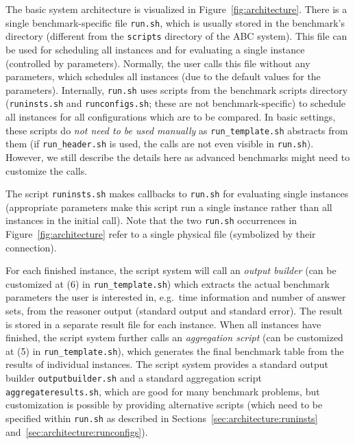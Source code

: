 \documentclass[a4paper]{article}
\newcommand{\abcs}{{ABC}}
\begin{document}
		The basic system architecture is visualized in Figure~\ref{fig:architecture}.
		There is a single benchmark-specific file {\tt run.sh}, which is usually stored
		in the benchmark's directory (different from the {\tt scripts} directory of the \abcs{} system).
		This file can be used for scheduling all instances and for evaluating a single instance
		(controlled by parameters). Normally, the user calls this file without any parameters,
		which schedules all instances (due to the default values for the parameters).
		Internally, {\tt run.sh} uses scripts from the benchmark scripts directory
		({\tt runinsts.sh} and {\tt runconfigs.sh}; these are not benchmark-specific) to schedule all instances for all configurations
		which are to be compared.
		In basic settings, these scripts do \emph{not need to be used manually} as {\tt run\_template.sh} abstracts from them
		(if {\tt run\_header.sh} is used, the calls are not even visible in {\tt run.sh}).
		However, we still describe the details here as advanced benchmarks might need to customize the calls.

		The script {\tt runinsts.sh} makes callbacks to {\tt run.sh} for evaluating single instances
		(appropriate parameters make this script run a single instance rather than all instances in the initial call).
		Note that the two {\tt run.sh} occurrences in Figure~\ref{fig:architecture} refer
		to a single physical file (symbolized by their connection).
		
		For each finished instance, the script system will call an \emph{output builder} (can be customized at (6) in {\tt run\_template.sh})
		which extracts the actual benchmark parameters the user is interested in,
		e.g.~time information and number of answer sets,
		from the reasoner output (standard output and standard error).
		The result is stored in a separate result file for each instance.
		When all instances have finished, the script system further calls an \emph{aggregation script} (can be customized at (5) in {\tt run\_template.sh}),
		which generates the final benchmark table from the results of individual instances.
		The script system provides a standard output builder {\tt outputbuilder.sh} and a standard aggregation script {\tt aggregateresults.sh},
		which are good for many benchmark problems, but customization is possible by providing alternative scripts
		(which need to be specified within {\tt run.sh} as described in Sections~\ref{sec:architecture:runinsts} and~\ref{sec:architecture:runconfigs}).
\end{document}
